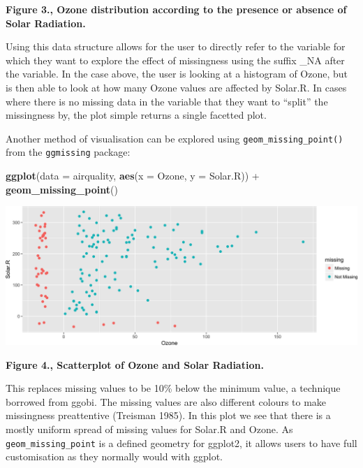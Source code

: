 \documentclass[]{article}
\newenvironment{Shaded}{\begin{snugshade}}{\end{snugshade}}
\newcommand{\KeywordTok}[1]{\textcolor[rgb]{0.13,0.29,0.53}{\textbf{{#1}}}}
\newcommand{\DataTypeTok}[1]{\textcolor[rgb]{0.13,0.29,0.53}{{#1}}}
\newcommand{\StringTok}[1]{\textcolor[rgb]{0.31,0.60,0.02}{{#1}}}
\newcommand{\NormalTok}[1]{{#1}}
\begin{document}
\textbf{Figure 3., Ozone distribution according to the presence or
absence of Solar Radiation.}

Using this data structure allows for the user to directly refer to the
variable for which they want to explore the effect of missingness using
the suffix \_NA after the variable. In the case above, the user is
looking at a histogram of Ozone, but is then able to look at how many
Ozone values are affected by Solar.R. In cases where there is no missing
data in the variable that they want to ``split'' the missingness by, the
plot simple returns a single facetted plot.

Another method of visualisation can be explored using
\texttt{geom\_missing\_point()} from the \texttt{ggmissing} package:

\begin{Shaded}
\begin{Highlighting}[]
\KeywordTok{ggplot}\NormalTok{(}\DataTypeTok{data =} \NormalTok{airquality,}
       \KeywordTok{aes}\NormalTok{(}\DataTypeTok{x =} \NormalTok{Ozone,}
           \DataTypeTok{y =} \NormalTok{Solar.R)) +}\StringTok{ }
\StringTok{  }\KeywordTok{geom_missing_point}\NormalTok{()}
\end{Highlighting}
\end{Shaded}

\includegraphics{blinded_jsm2017_missing_data_vis_files/figure-latex/ggeom_missing-1.png}

\textbf{Figure 4., Scatterplot of Ozone and Solar Radiation.}

This replaces missing values to be 10\% below the minimum value, a
technique borrowed from ggobi. The missing values are also different
colours to make missingness preattentive (Treisman 1985). In this plot
we see that there is a mostly uniform spread of missing values for
Solar.R and Ozone. As \texttt{geom\_missing\_point} is a defined
geometry for ggplot2, it allows users to have full customisation as they
normally would with ggplot.
\end{document}
